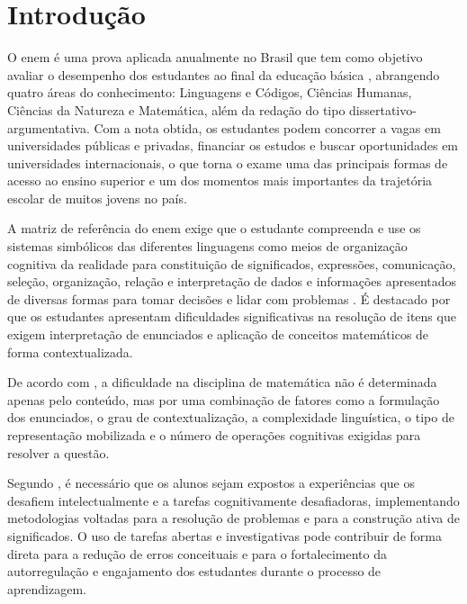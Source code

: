 
\chapter{Introdução}
\label{ch:introducao}
O \gls{enem} é uma prova aplicada anualmente no
Brasil que tem como objetivo avaliar o desempenho dos estudantes ao final da
educação básica \cite{brasil2026enem}, abrangendo quatro áreas do conhecimento: 
Linguagens e Códigos, Ciências Humanas, Ciências da Natureza e Matemática, além
da redação do tipo dissertativo-argumentativa. Com a nota obtida, os estudantes
podem concorrer a vagas em universidades públicas e privadas, financiar os
estudos e buscar oportunidades em universidades internacionais, o que torna o
exame uma das principais formas de acesso ao ensino superior e um dos
momentos mais importantes da trajetória escolar de muitos jovens no país.

A matriz de referência do \gls{enem} exige que o estudante compreenda e use os
sistemas simbólicos das diferentes linguagens como meios de organização
cognitiva da realidade para constituição de significados, expressões,
comunicação, seleção, organização, relação e interpretação de dados
e informações apresentados de diversas formas para tomar decisões e lidar com
problemas \cite{matriz_enem}. É destacado por \cite{piton2018analise} que os
estudantes apresentam dificuldades significativas na resolução de itens que
exigem interpretação de enunciados e aplicação de conceitos matemáticos de forma
contextualizada.

De acordo com \cite{soares2026diferencas}, a dificuldade na disciplina de matemática 
não é determinada apenas pelo conteúdo, mas por uma combinação de fatores como a
formulação dos enunciados, o grau de contextualização, a complexidade
linguística, o tipo de representação mobilizada e o número de operações
cognitivas exigidas para resolver a questão.

Segundo \cite{jesus2026ensino}, é necessário que os alunos sejam expostos a
experiências que os desafiem intelectualmente e a tarefas cognitivamente
desafiadoras, implementando metodologias voltadas para a resolução de problemas
e para a construção ativa de significados. O uso de tarefas abertas e
investigativas pode contribuir de forma direta para a redução de erros
conceituais e para o fortalecimento da autorregulação e engajamento dos
estudantes durante o processo de aprendizagem.

